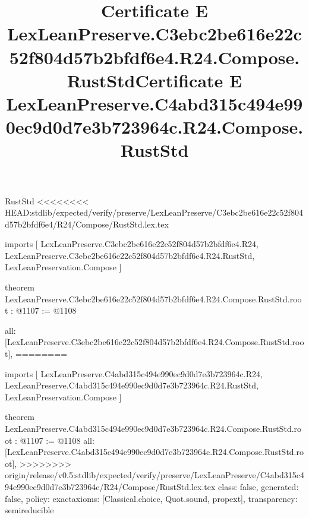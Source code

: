 \begin{lexlean}{RustStd}
<<<<<<<< HEAD:stdlib/expected/verify/preserve/LexLeanPreserve/C3ebc2be616e22c52f804d57b2bfdf6e4/R24/Compose/RustStd.lex.tex
\title{Certificate E LexLeanPreserve.C3ebc2be616e22c52f804d57b2bfdf6e4.R24.Compose.RustStd}
\begin{coremodule}
imports [
  LexLeanPreserve.C3ebc2be616e22c52f804d57b2bfdf6e4.R24,
  LexLeanPreserve.C3ebc2be616e22c52f804d57b2bfdf6e4.R24.RustStd,
  LexLeanPreservation.Compose
]

theorem LexLeanPreserve.C3ebc2be616e22c52f804d57b2bfdf6e4.R24.Compose.RustStd.root : @1107 := @1108 {
  all: [LexLeanPreserve.C3ebc2be616e22c52f804d57b2bfdf6e4.R24.Compose.RustStd.root],
========
\title{Certificate E LexLeanPreserve.C4abd315c494e990ec9d0d7e3b723964c.R24.Compose.RustStd}
\begin{coremodule}
imports [
  LexLeanPreserve.C4abd315c494e990ec9d0d7e3b723964c.R24,
  LexLeanPreserve.C4abd315c494e990ec9d0d7e3b723964c.R24.RustStd,
  LexLeanPreservation.Compose
]

theorem LexLeanPreserve.C4abd315c494e990ec9d0d7e3b723964c.R24.Compose.RustStd.root : @1107 := @1108 {
  all: [LexLeanPreserve.C4abd315c494e990ec9d0d7e3b723964c.R24.Compose.RustStd.root],
>>>>>>>> origin/release/v0.5:stdlib/expected/verify/preserve/LexLeanPreserve/C4abd315c494e990ec9d0d7e3b723964c/R24/Compose/RustStd.lex.tex
  class: false,
  generated: false,
  policy: exact{axioms: [Classical.choice, Quot.sound, propext]},
  transparency: semireducible
}


\end{coremodule}}
\end{coremodule}
\end{lexlean}
